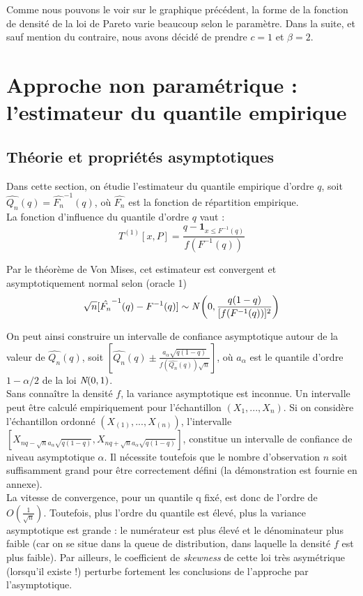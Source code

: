 \documentclass{article}
\renewcommand*{\(}{ \left( }
\renewcommand*{\)}{ \right) }
\begin{document}
Comme nous pouvons le voir sur le graphique précédent, la forme de la fonction de densité de la loi de Pareto varie beaucoup selon le paramètre. Dans la suite, et sauf mention du contraire, nous avons décidé de prendre $c = 1$ et $\beta = 2$.
\clearpage
\section{Approche non paramétrique : l'estimateur du quantile empirique}

\subsection{Théorie et propriétés asymptotiques}
Dans cette section, on étudie l'estimateur du quantile empirique d'ordre $q$, soit  $\hat{Q_n}(q)=\hat{F_n}^{-1}(q)$, où $\hat{F_n}$ est la fonction de répartition empirique.\\
La fonction d'influence du quantile d'ordre $q$ vaut \cite{Bertail}:
\[ \label{influenceQ} T^{(1)}[x,P] = \frac{q-\mathbf{1}_{x \leq F^{-1}(q)} }{ f(F^{-1}(q)) } \]

Par le théorème de Von Mises, cet estimateur est convergent et asymptotiquement normal selon (oracle 1) 
\[ \label{var1}
\sqrt{n}[\hat{F_n}^{-1}(q)-F^{-1}(q)]\sim \emph{N} \left( 0,\frac{q(1-q)}{[f(F^{-1}(q))]^2} \right)
\]

On peut ainsi construire un intervalle de confiance asymptotique autour de la valeur de $\hat{Q_n}(q)$, soit $[\hat{Q_n}(q) \pm \frac{a_{\alpha}\sqrt{q(1-q)}}{f(\hat{Q_n}(q))\sqrt{n}}]$, où $a_{\alpha}$ est le quantile d'ordre $1-\alpha/2$ de la loi $\emph{N}(0,1)$. \\

Sans connaître la densité $f$, la variance asymptotique est inconnue. Un intervalle peut être calculé empiriquement pour l'échantillon $(X_1, ..., X_n)$. Si on considère l'échantillon ordonné $(X_{(1)}, ..., X_{(n)})$, l'intervalle $[X_{nq-\sqrt{n}a_\alpha\sqrt{q(1-q)}},X_{nq+\sqrt{n}a_\alpha\sqrt{q(1-q)}}]$, constitue un intervalle de confiance de niveau asymptotique $\alpha$. Il nécessite toutefois que le nombre d'observation $n$ soit suffisamment grand pour être correctement défini (la démonstration est fournie en annexe).\\

La vitesse de convergence, pour un quantile q fixé, est donc de l'ordre de $O(\frac{1}{\sqrt{n}})$.
Toutefois, plus l'ordre du quantile est élevé, plus la variance asymptotique est grande : le numérateur est plus élevé et le dénominateur plus faible (car on se situe dans la queue de distribution, dans laquelle la densité $f$ est plus faible). Par ailleurs, le coefficient de \textit{skewness} de cette loi très asymétrique (lorsqu'il existe !) perturbe fortement les conclusions de l'approche par l'asymptotique.\\
\end{document}
